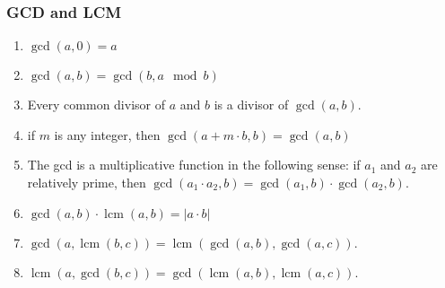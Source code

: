 \subsubsection{GCD and LCM}\begin{enumerate}

            
            \item $\displaystyle \gcd(a, 0) = a$
            \item $\displaystyle \gcd(a, b) = \gcd(b, a \mod b)$
            \item Every common divisor of $\displaystyle a$ and $b$ is a divisor of $\displaystyle \gcd(a,b)$.
            \item if $m$ is any integer, then $\displaystyle \gcd(a + m {\cdot} b, b) = \gcd(a, b)$
            \item The gcd is a multiplicative function in the following sense: if $\displaystyle a_1$ and $\displaystyle
                a_2$
                are
                relatively prime, then $\displaystyle \gcd(a_1 \cdot a_2, b) = \gcd(a_1, b) \cdot \gcd(a_2,b )$.
            \item $\displaystyle \gcd(a, b){\cdot} \operatorname{lcm}(a, b) = |a{\cdot}b|$
            \item $\displaystyle \gcd(a, \operatorname{lcm}(b, c)) = \operatorname{lcm}(\gcd(a, b), \gcd(a, c))$.
            \item $\displaystyle \operatorname{lcm}(a, \gcd(b, c)) = \gcd(\operatorname{lcm}(a, b), \operatorname{lcm}(a,
                c))$.
            

\end{enumerate}
